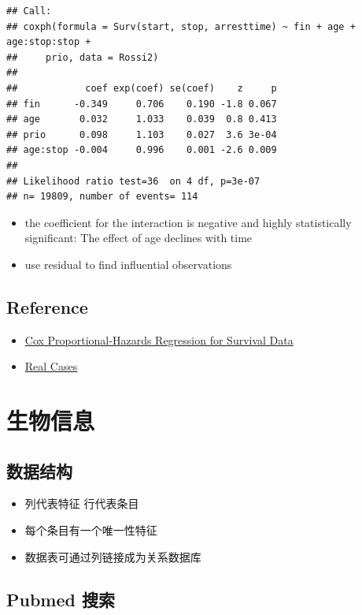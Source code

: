 \documentclass[]{book}
\providecommand{\tightlist}{%
  \setlength{\itemsep}{0pt}\setlength{\parskip}{0pt}}
\begin{document}
\begin{verbatim}
## Call:
## coxph(formula = Surv(start, stop, arresttime) ~ fin + age + age:stop:stop + 
##     prio, data = Rossi2)
## 
##            coef exp(coef) se(coef)    z     p
## fin      -0.349     0.706    0.190 -1.8 0.067
## age       0.032     1.033    0.039  0.8 0.413
## prio      0.098     1.103    0.027  3.6 3e-04
## age:stop -0.004     0.996    0.001 -2.6 0.009
## 
## Likelihood ratio test=36  on 4 df, p=3e-07
## n= 19809, number of events= 114
\end{verbatim}

\begin{itemize}
\item
  the coefficient for the interaction is negative and highly statistically significant: The effect of age declines with time
\item
  use residual to find influential observations
\end{itemize}

\hypertarget{reference}{%
\section{Reference}\label{reference}}

\begin{itemize}
\tightlist
\item
  \href{http://cran.r-project.org/doc/contrib/Fox-Companion/appendix-cox-regression.pdf}{Cox Proportional-Hazards Regression for Survival Data}
\item
  \href{http://ehp.niehs.nih.gov/1104049/}{Real Cases}
\end{itemize}

\chapter{生物信息}

\section{数据结构}

\begin{itemize}
\tightlist
\item
  列代表特征 行代表条目
\item
  每个条目有一个唯一性特征
\item
  数据表可通过列链接成为关系数据库
\end{itemize}

\hypertarget{pubmed-}{%
\section{Pubmed 搜索}\label{pubmed-}}
\end{document}
